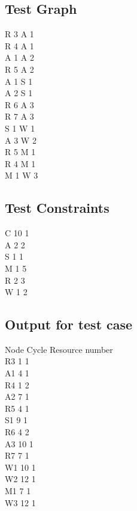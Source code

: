 \documentclass[letterpaper, 10 pt, conference]{ieeeconf}  %
\begin{document}
\subsection{Test Graph}
\label{g}
R 3 A 1 \\
R 4 A 1\\
A 1 A 2\\
R 5 A 2\\
A 1 S 1\\
A 2 S 1\\
R 6 A 3\\
R 7 A 3\\
S 1 W 1\\
A 3 W 2\\
R 5 M 1\\
R 4 M 1\\
M 1 W 3\\

\subsection{Test Constraints}
\label{c}%
C 10 1\\
A 2 2\\
S 1 1\\
M 1 5\\
R 2 3\\
W 1 2\\

\subsection{Output for test case}
\label{o}%
Node    Cycle   Resource number\\
R3      1       1\\
A1      4       1\\
R4      1       2\\
A2      7       1\\
R5      4       1\\
S1      9       1\\
R6      4       2\\
A3      10      1\\
R7      7       1\\
W1      10      1\\
W2      12      1\\
M1      7       1\\
W3      12      1\\


\end{document}
